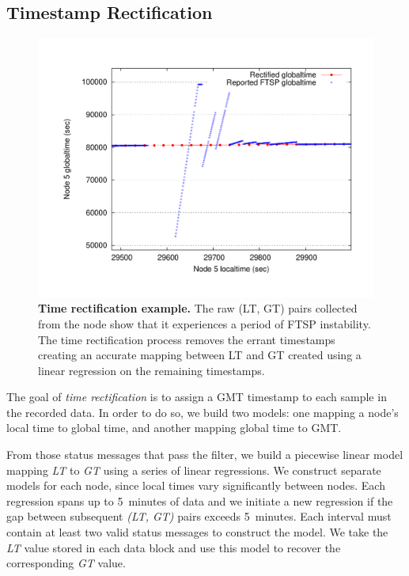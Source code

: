 \subsection{Timestamp Rectification}
\label{evaluation-subsec-timerectification}

\begin{figure}[t]
\begin{center}
\includegraphics[width=\hsize]{./3-evaluation/figs/rectificationexample.pdf}
\end{center}

\caption{\textbf{Time rectification example.} The raw (LT, GT) pairs
collected from the node show that it experiences a period of FTSP
instability. The time rectification process removes the errant timestamps
creating an accurate mapping between LT and GT created using a linear
regression on the remaining timestamps.}

\label{evaluation-fig-rectificationexample}
\end{figure}

The goal of \textit{time rectification} is to assign a GMT timestamp to each
sample in the recorded data. In order to do so, we build two models: one
mapping a node's local time to global time, and another mapping global time
to GMT.

From those status messages that pass the filter, we build a piecewise linear
model mapping \textit{LT} to \textit{GT} using a series of linear
regressions. We construct separate models for each node, since local times
vary significantly between nodes. Each regression spans up to 5~minutes of
data and we initiate a new regression if the gap between subsequent
\textit{(LT, GT)} pairs exceeds 5~minutes. Each interval must contain at
least two valid status messages to construct the model. We take the
\textit{LT} value stored in each data block and use this model to recover the
corresponding \textit{GT} value.

